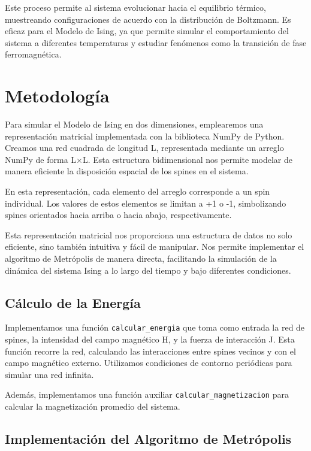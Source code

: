 \documentclass[twocolumn]{article}
\begin{document}
Este proceso permite al sistema evolucionar hacia el equilibrio térmico, muestreando configuraciones de acuerdo con la distribución de Boltzmann. Es eficaz para el Modelo de Ising, ya que permite simular el comportamiento del sistema a diferentes temperaturas y estudiar fenómenos como la transición de fase ferromagnética.


\section{Metodología}

Para simular el Modelo de Ising en dos dimensiones, emplearemos una representación matricial implementada con la biblioteca NumPy de Python. Creamos una red cuadrada de longitud L, representada mediante un arreglo NumPy de forma L×L. Esta estructura bidimensional nos permite modelar de manera eficiente la disposición espacial de los spines en el sistema.

En esta representación, cada elemento del arreglo corresponde a un spin individual. Los valores de estos elementos se limitan a +1 o -1, simbolizando spines orientados hacia arriba o hacia abajo, respectivamente.

Esta representación matricial nos proporciona una estructura de datos no solo eficiente, sino también intuitiva y fácil de manipular. Nos permite implementar el algoritmo de Metrópolis de manera directa, facilitando la simulación de la dinámica del sistema Ising a lo largo del tiempo y bajo diferentes condiciones.

\subsection*{Cálculo de la Energía}

Implementamos una función \texttt{calcular\_energia} que toma como entrada la red de spines, la intensidad del campo magnético H, y la fuerza de interacción J. Esta función recorre la red, calculando las interacciones entre spines vecinos y con el campo magnético externo. Utilizamos condiciones de contorno periódicas para simular una red infinita.

Además, implementamos una función auxiliar \texttt{calcular\_magnetizacion} para calcular la magnetización promedio del sistema.


\subsection*{Implementación del Algoritmo de Metrópolis}
\end{document}
